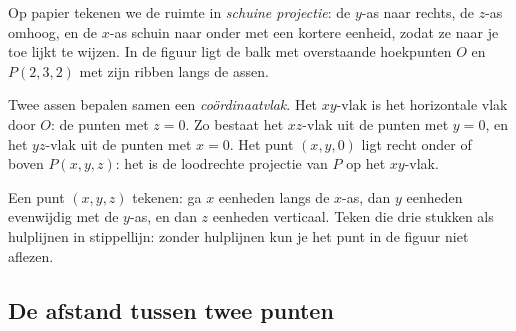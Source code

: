 Op papier tekenen we de ruimte in \textit{schuine projectie}: de $y$-as naar rechts, de $z$-as omhoog, en de $x$-as schuin naar onder met een kortere eenheid, zodat ze naar je toe lijkt te wijzen. In de figuur ligt de balk met overstaande hoekpunten $O$ en $P(2, 3, 2)$ met zijn ribben langs de assen.

Twee assen bepalen samen een \textit{coördinaatvlak}. Het $xy$-vlak is het horizontale vlak door $O$: de punten met $z = 0$. Zo bestaat het $xz$-vlak uit de punten met $y = 0$, en het $yz$-vlak uit de punten met $x = 0$. Het punt $(x, y, 0)$ ligt recht onder of boven $P(x, y, z)$: het is de loodrechte projectie van $P$ op het $xy$-vlak.


\begin{werkwijze}
Een punt $(x, y, z)$ tekenen: ga $x$ eenheden langs de $x$-as, dan $y$ eenheden evenwijdig met de $y$-as, en dan $z$ eenheden verticaal. Teken die drie stukken als hulplijnen in stippellijn: zonder hulplijnen kun je het punt in de figuur niet aflezen.
\end{werkwijze}

\begin{oefeningen}
\end{oefeningen}

\subsection{De afstand tussen twee punten}

